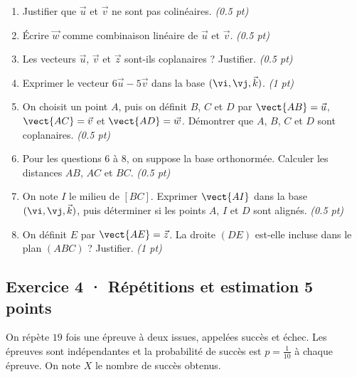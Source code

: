 \begin{enumerate}

\item Justifier que $\vec u$ et $\vec v$ ne sont pas colinéaires. \hfill\textit{(\num{0,5} pt)}

\item Écrire $\vec w$ comme combinaison linéaire de $\vec u$ et $\vec v$. \hfill\textit{(\num{0,5} pt)}

\item Les vecteurs $\vec u$, $\vec v$ et $\vec z$ sont-ils coplanaires ? Justifier. \hfill\textit{(\num{0,5} pt)}

\item Exprimer le vecteur $6\vec u-5\vec v$ dans la base $(\vi,\vj,\vec k)$. \hfill\textit{(1 pt)}

\item On choisit un point $A$, puis on définit $B$, $C$ et $D$ par $\vect{AB}=\vec u$, $\vect{AC}=\vec v$ et $\vect{AD}=\vec w$. Démontrer que $A$, $B$, $C$ et $D$ sont coplanaires. \hfill\textit{(\num{0,5} pt)}

\item Pour les questions 6 à 8, on suppose la base orthonormée. Calculer les distances $AB$, $AC$ et $BC$. \hfill\textit{(\num{0,5} pt)}

\item On note $I$ le milieu de $[BC]$. Exprimer $\vect{AI}$ dans la base $(\vi,\vj,\vec k)$, puis déterminer si les points $A$, $I$ et $D$ sont alignés. \hfill\textit{(\num{0,5} pt)}

\item On définit $E$ par $\vect{AE}=\vec z$. La droite $(DE)$ est-elle incluse dans le plan $(ABC)$ ? Justifier. \hfill\textit{(1 pt)}

\end{enumerate}

\subsection*{Exercice 4 · Répétitions et estimation \hfill 5 points}On répète $19$ fois une épreuve à deux issues, appelées succès et échec. Les épreuves sont indépendantes et la probabilité de succès est $p=\frac{1}{10}$ à chaque épreuve. On note $X$ le nombre de succès obtenus.

